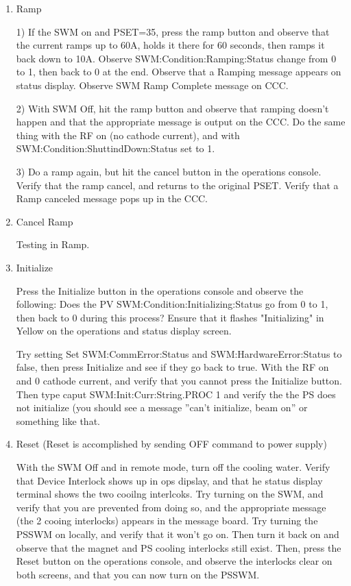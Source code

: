 \documentclass[11pt]{book}		%
\begin{document}
\begin{enumerate}
\color{black}


\item Ramp

\color{red}

1) If the SWM on and PSET=35, press the ramp button and observe that the current ramps up to 60A, holds it there for 60 seconds, then ramps it back down to 10A. Observe SWM:Condition:Ramping:Status change from 0 to 1, then back to 0 at the end. Observe that a Ramping message appears on status display. Observe SWM Ramp Complete message on CCC.

2) With SWM Off, hit the ramp button and observe that ramping doesn't happen and that the appropriate message is output on the CCC. Do the same thing with the RF on (no cathode current), and with SWM:Condition:ShuttindDown:Status set to 1.

3) Do a ramp again, but hit the cancel button in the operations console. Verify that the ramp cancel, and returns to the original PSET. Verify that a Ramp canceled message pops up in the CCC.

\color{black}

\item Cancel Ramp


\color{red}

Testing in Ramp.


\color{black}


 \item Initialize

\color{red}

Press the Initialize button in the operations console and observe the following:
	Does the PV SWM:Condition:Initializing:Status go from 0 to 1, then back to 0 during this process? 
	Ensure that it flashes "Initializing" in Yellow on the operations and status display screen. 

Try setting Set SWM:CommError:Status and SWM:HardwareError:Status to false, then press Initialize and see if they go back to true.
With the RF on and 0 cathode current, and verify that you cannot press the Initialize button. Then type caput SWM:Init:Curr:String.PROC 1 and verify the the PS does not initialize (you should see a message ''can't initialize, beam on'' or something like that.

\color{black}


 \item Reset (Reset is accomplished by sending OFF command to power supply)

\color{red}

With the SWM Off and in remote mode, turn off the cooling water. Verify that Device Interlock shows up in ops dipslay, and that he status display terminal shows the two cooilng interlcoks. Try turning on the SWM, and verify that you are prevented from doing so, and the appropriate message (the 2 cooing interlocks) appears in the message board. Try turning the PSSWM on locally, and verify that it won't go on. Then turn it back on and observe that the magnet and PS cooling interlocks still exist. Then, press the Reset button on the operations console, and observe the interlocks clear on both screens, and that you can now turn on the PSSWM.


\end{enumerate}
\end{document}
